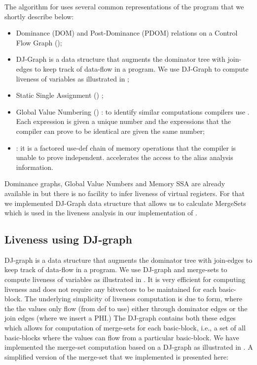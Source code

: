 \documentclass[acmlarge,review,anonymous]{acmart}\settopmatter{printfolios=true}
\begin{document}
The algorithm for \gcm{} uses several common representations of the
program that we shortly describe below:
\begin{itemize}
\item Dominance (DOM) and Post-Dominance (PDOM) relations \cite{dragonbook} on a
  Control Flow Graph (\CFG{});
\item DJ-Graph \cite{Sreedhar1996} is a data structure that augments the
  dominator tree with join-edges to keep track of data-flow in a program. We use
  DJ-Graph to compute liveness of variables as illustrated in \cite{das2012};
\item Static Single Assignment (\SSA{}) \cite{cytron};
\item Global Value Numbering (\GVN{}) \cite{rosen1988global,click1995global}: to
  identify similar computations compilers use \GVN{}.  Each expression is given
  a unique number and the expressions that the compiler can prove to be
  identical are given the same number;
\item \MemorySSA{} \cite{novillo2007memory}: it is a factored use-def chain of
  memory operations that the compiler is unable to prove
  independent. \MemorySSA{} accelerates the access to the alias analysis
  information.
\end{itemize}

Dominance graphs, Global Value Numbers and Memory SSA are already available in
\LLVM{} but there is no facility to infer liveness of virtual registers. For
that we implemented DJ-Graph data structure that allows us to calculate
MergeSets which is used in the liveness analysis in our implementation of \GCM{}.

\subsection{Liveness using DJ-graph}
DJ-graph \cite{Sreedhar1996} is a data structure that augments the dominator
tree with join-edges to keep track of data-flow in a program. We use DJ-graph
and merge-sets to compute liveness of variables as illustrated in
\cite{das2012}.  It is very efficient for computing liveness and does not
require any bitvectors to be maintained for each basic-block. The underlying
simplicity of liveness computation is due to \SSA{} form, where the the values
only flow (from def to use) either through dominator edges or the join edges
(where we insert a PHI.) The DJ-graph contains both these edges which allows for
computation of merge-sets for each basic-block, i.e., a set of all basic-blocks
where the values can flow from a particular basic-block. We have implemented the
merge-set computation based on a DJ-graph as illustrated in \cite{das2005}. A
simplified version of the merge-set that we implemented is presented here:
\end{document}
